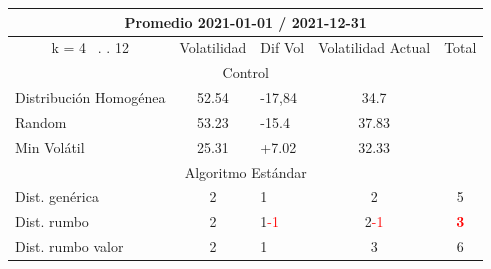 \documentclass[12pt,a4paper]{article}
\begin{document}
	\begin{table}[H]
	
\centering
\begin{tabular}{l|c|l|c|c|} 
\hline
\multicolumn{5}{c}{{\cellcolor[rgb]{0.635,0.647,0.788}}Promedio 2021-01-01 / 2021-12-31}                                                                                                                               \\ 
\hline
\multicolumn{1}{c|}{{\cellcolor[rgb]{0.635,0.647,0.788}}k = 4~ . . 12} & Volatilidad                     & Dif Vol                         & Volatilidad Actual              & \multicolumn{1}{l|}{Total}              \\ 
\hline
\multicolumn{5}{c}{{\cellcolor[rgb]{0.796,0.808,0.984}}Control}                                                                                                                                                        \\ 
\hline
\rowcolor[rgb]{0.925,0.957,1} Distribución Homogénea                   & 52.54                           & -17,84                          & 34.7                            &                                         \\
\rowcolor[rgb]{0.855,0.91,0.988} Random                                & 53.23                           & -15.4                           & 37.83                           &                                         \\
\rowcolor[rgb]{0.925,0.957,1} Min Volátil                              & 25.31                           & +7.02                           & 32.33                           &                                         \\ 
\hline
\multicolumn{5}{c}{{\cellcolor[rgb]{0.796,0.808,0.984}}Algoritmo Estándar}                                                                                                                                             \\ 
\hline
\rowcolor[rgb]{0.925,0.957,1} Dist. genérica                           & 2                               & 1                               & 2                               & 5                                       \\
\rowcolor[rgb]{0.855,0.91,0.988} Dist. rumbo                           & 2                               & 1\textcolor{red}{-1}            & 2\textcolor{red}{-1}            & \textcolor{red}{\textbf{3}}             \\
\rowcolor[rgb]{0.925,0.957,1} Dist. rumbo valor                        & 2                               & 1                               & 3                               & 6                                       \\ 

\end{tabular}
\end{table}
\end{document}
